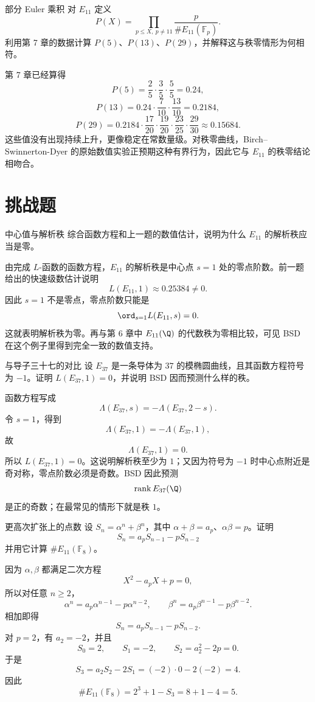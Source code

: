 \begin{problem}{部分 Euler 乘积}
\medium
对 $E_{11}$ 定义
\[
P(X)=\prod_{p\le X,\ p\ne11}\frac{p}{\#E_{11}(\mathbb{F}_p)}.
\]
利用第 7 章的数据计算 $P(5)$、$P(13)$、$P(29)$，并解释这与秩零情形为何相符。
\end{problem}
\begin{solution}
第 7 章已经算得
\[
P(5)=\frac25\cdot\frac35\cdot\frac55=0.24,
\]
\[
P(13)=0.24\cdot\frac7{10}\cdot\frac{13}{10}=0.2184,
\]
\[
P(29)=0.2184\cdot\frac{17}{20}\cdot\frac{19}{20}\cdot\frac{23}{25}\cdot\frac{29}{30}
\approx 0.15684.
\]
这些值没有出现持续上升，更像稳定在常数量级。对秩零曲线，Birch--Swinnerton-Dyer 的原始数值实验正预期这种有界行为，因此它与 $E_{11}$ 的秩零结论相吻合。
\end{solution}

\section{挑战题 \hard}

\begin{problem}{中心值与解析秩}
\hard
综合函数方程和上一题的数值估计，说明为什么 $E_{11}$ 的解析秩应当是零。
\end{problem}
\begin{solution}
由完成 $L$-函数的函数方程，$E_{11}$ 的解析秩是中心点 $s=1$ 处的零点阶数。前一题给出的快速级数估计说明
\[
L(E_{11},1)\approx 0.25384\ne0.
\]
因此 $s=1$ 不是零点，零点阶数只能是
\[
\ord_{s=1}L(E_{11},s)=0.
\]
这就表明解析秩为零。再与第 6 章中 $E_{11}(\Q)$ 的代数秩为零相比较，可见 BSD 在这个例子里得到完全一致的数值支持。
\end{solution}

\begin{problem}{与导子三十七的对比}
\hard
设 $E_{37}$ 是一条导体为 $37$ 的模椭圆曲线，且其函数方程符号为 $-1$。证明 $L(E_{37},1)=0$，并说明 BSD 因而预测什么样的秩。
\end{problem}
\begin{solution}
函数方程写成
\[
\Lambda(E_{37},s)=-\Lambda(E_{37},2-s).
\]
令 $s=1$，得到
\[
\Lambda(E_{37},1)=-\Lambda(E_{37},1),
\]
故
\[
\Lambda(E_{37},1)=0.
\]
所以 $L(E_{37},1)=0$。这说明解析秩至少为 $1$；又因为符号为 $-1$ 时中心点附近是奇对称，零点阶数必须是奇数。BSD 因此预测
\[
\operatorname{rank}E_{37}(\Q)
\]
是正的奇数；在最常见的情形下就是秩 $1$。
\end{solution}

\begin{problem}{更高次扩张上的点数}
\hard
设 $S_n=\alpha^n+\beta^n$，其中 $\alpha+\beta=a_p$、$\alpha\beta=p$。证明
\[
S_n=a_pS_{n-1}-pS_{n-2}
\]
并用它计算 $\#E_{11}(\mathbb{F}_8)$。
\end{problem}
\begin{solution}
因为 $\alpha,\beta$ 都满足二次方程
\[
X^2-a_pX+p=0,
\]
所以对任意 $n\ge2$，
\[
\alpha^n=a_p\alpha^{n-1}-p\alpha^{n-2},
\qquad
\beta^n=a_p\beta^{n-1}-p\beta^{n-2}.
\]
相加即得
\[
S_n=a_pS_{n-1}-pS_{n-2}.
\]
对 $p=2$，有 $a_2=-2$，并且
\[
S_0=2,
\qquad S_1=-2,
\qquad S_2=a_2^2-2p=0.
\]
于是
\[
S_3=a_2S_2-2S_1=(-2)\cdot 0-2(-2)=4.
\]
因此
\[
\#E_{11}(\mathbb{F}_8)=2^3+1-S_3=8+1-4=5.
\]
\end{solution}

